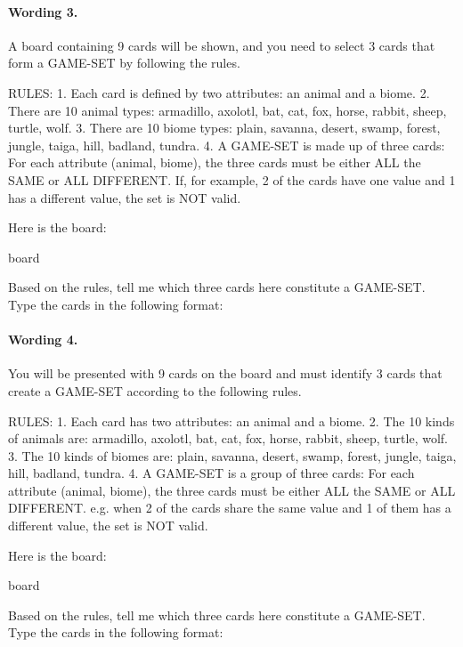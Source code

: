\paragraph{Wording 3.}
\begin{promptbox}
A board containing 9 cards will be shown, and you need to select 3 cards that form a GAME-SET by following the rules.

RULES:
1. Each card is defined by two attributes: an animal and a biome.
2. There are 10 animal types: armadillo, axolotl, bat, cat, fox, horse, rabbit, sheep, turtle, wolf.
3. There are 10 biome types: plain, savanna, desert, swamp, forest, jungle, taiga, hill, badland, tundra.
4. A GAME-SET is made up of three cards: For each attribute (animal, biome), the three cards must be either ALL the SAME or ALL DIFFERENT. If, for example, 2 of the cards have one value and 1 has a different value, the set is NOT valid.

Here is the board:

{board}

Based on the rules, tell me which three cards here constitute a GAME-SET. Type the cards in the following format:
\end{promptbox}

\paragraph{Wording 4.}
\begin{promptbox}
You will be presented with 9 cards on the board and must identify 3 cards that create a GAME-SET according to the following rules.

RULES:
1. Each card has two attributes: an animal and a biome.
2. The 10 kinds of animals are: armadillo, axolotl, bat, cat, fox, horse, rabbit, sheep, turtle, wolf.
3. The 10 kinds of biomes are: plain, savanna, desert, swamp, forest, jungle, taiga, hill, badland, tundra.
4. A GAME-SET is a group of three cards: For each attribute (animal, biome), the three cards must be either ALL the SAME or ALL DIFFERENT. e.g. when 2 of the cards share the same value and 1 of them has a different value, the set is NOT valid.

Here is the board:

{board}

Based on the rules, tell me which three cards here constitute a GAME-SET. Type the cards in the following format:
\end{promptbox}

